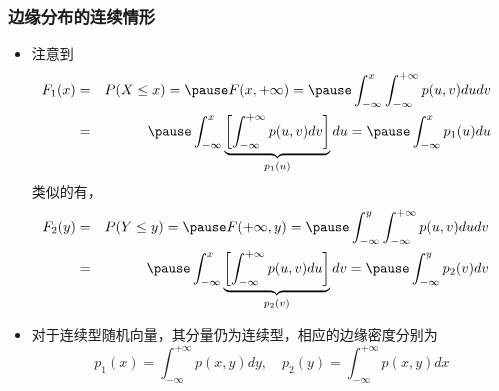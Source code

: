 \begin{frame}
	\frametitle{边缘分布的连续情形}
	\begin{itemize}[<+-|alert@+>]
		\item 注意到
		\vspace{-0.4cm}\begin{eqnarray*}
			\hspace{-0.3cm}F_1(x)&=&P(X\le x)=\pause F(x,+\infty)=\pause \int_{-\infty}^x\int_{-\infty}^{+\infty}p(u,v)dudv\\
			&=&\pause \int_{-\infty}^x\underbrace{\left[\int_{-\infty}^{+\infty}p(u,v)dv\right]}_{p_1(u)}du=\pause \int_{-\infty}^xp_1(u)du
		\end{eqnarray*}
		\vspace{-0.4cm}   \pause  类似的有，\begin{eqnarray*}
			\hspace{-0.3cm}F_2(y)&=&P(Y\le y)=\pause F(+\infty,y)=\pause \int_{-\infty}^y\int_{-\infty}^{+\infty}p(u,v)dudv\\
			&=&\pause \int_{-\infty}^x\underbrace{\left[\int_{-\infty}^{+\infty}p(u,v)du\right]}_{p_2(v)}dv=\pause \int_{-\infty}^yp_2(v)dv
		\end{eqnarray*}
\item 对于连续型随机向量，其分量仍为连续型，相应的边缘密度分别为 $$p_1 (x)=\int_{-\infty}^{+\infty} p (x,y) dy,\quad  p_2 (y)=\int_{-\infty}^{+\infty} p (x,y) dx$$
\end{itemize}
\end{frame}
